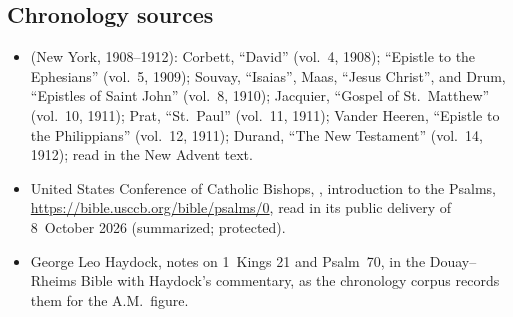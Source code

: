 {\subsection*{Chronology sources}
\begin{itemize}[itemsep=0pt,topsep=.25em]
\item {} (New York, 1908--1912): Corbett, ``David'' (vol.~4, 1908); ``Epistle to the Ephesians'' (vol.~5, 1909); Souvay, ``Isaias'', Maas, ``Jesus Christ'', and Drum, ``Epistles of Saint John'' (vol.~8, 1910); Jacquier, ``Gospel of St.~Matthew'' (vol.~10, 1911); Prat, ``St.~Paul'' (vol.~11, 1911); Vander Heeren, ``Epistle to the Philippians'' (vol.~12, 1911); Durand, ``The New Testament'' (vol.~14, 1912); read in the New Advent text.
\item United States Conference of Catholic Bishops, , introduction to the Psalms, \url{https://bible.usccb.org/bible/psalms/0}, read in its public delivery of 8~October 2026 (summarized; protected).
\item George Leo Haydock, notes on 1~Kings 21 and Psalm~70, in the Douay--Rheims Bible with Haydock's commentary, as the chronology corpus records them for the A.M.\ figure.
\end{itemize}
\par}
